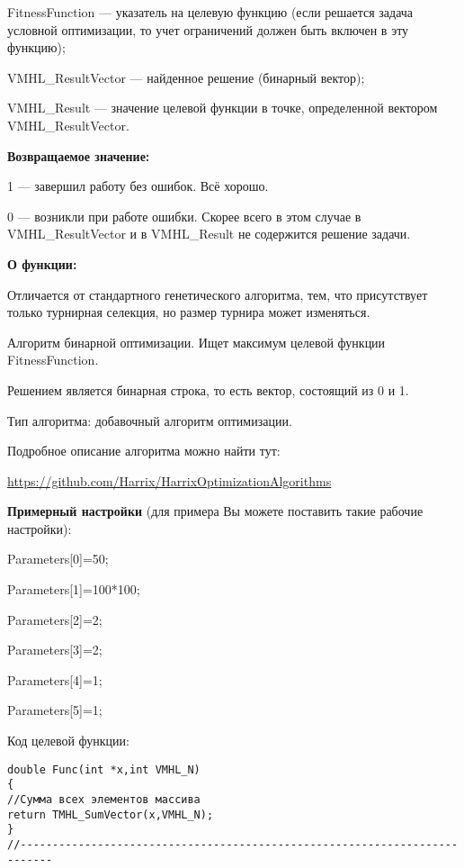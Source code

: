 \documentclass[a4paper,12pt]{article}
\begin{document}
FitnessFunction --- указатель на целевую функцию (если решается задача условной оптимизации, то учет ограничений должен быть включен в эту функцию);
 
VMHL\_ResultVector --- найденное решение (бинарный вектор);
 
VMHL\_Result --- значение целевой функции в точке, определенной вектором VMHL\_ResultVector.

\textbf{Возвращаемое значение:} 

 1 --- завершил работу без ошибок. Всё хорошо.
 
 0 --- возникли при работе ошибки. Скорее всего в этом случае в VMHL\_ResultVector и в VMHL\_Result не содержится решение задачи.

 
\textbf{О функции:}

Отличается от стандартного генетического алгоритма, тем, что присутствует только турнирная селекция, но размер турнира может изменяться.

Алгоритм бинарной оптимизации. Ищет максимум целевой функции FitnessFunction.

Решением является бинарная строка, то есть вектор, состоящий из 0 и 1.

Тип алгоритма: добавочный алгоритм оптимизации.

Подробное описание алгоритма можно найти тут:

\href{https://github.com/Harrix/HarrixOptimizationAlgorithms/blob/master/\_HarrixOptimizationAlgorithms.pdf}{https://github.com/Harrix/HarrixOptimizationAlgorithms}

\textbf{Примерный настройки} (для примера Вы можете поставить такие рабочие настройки):

 Parameters[0]=50;
 
Parameters[1]=100*100;

Parameters[2]=2;

Parameters[3]=2;

Parameters[4]=1;

Parameters[5]=1;

Код целевой функции:
\begin{lstlisting}[caption=Оптимизируемая функция]
double Func(int *x,int VMHL_N)
{
//Сумма всех элементов массива
return TMHL_SumVector(x,VMHL_N);
}
//---------------------------------------------------------------------------
\end{lstlisting}
\end{document}
